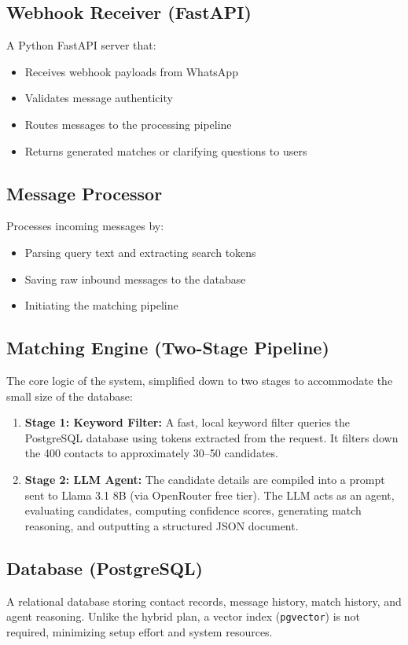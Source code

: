 \documentclass[12pt, a4paper]{report}
\newcommand{\techstack}[1]{\texttt{#1}}
\begin{document}
\subsection{Webhook Receiver (FastAPI)}
A Python FastAPI server that:
\begin{itemize}
    \item Receives webhook payloads from WhatsApp
    \item Validates message authenticity
    \item Routes messages to the processing pipeline
    \item Returns generated matches or clarifying questions to users
\end{itemize}

\subsection{Message Processor}
Processes incoming messages by:
\begin{itemize}
    \item Parsing query text and extracting search tokens
    \item Saving raw inbound messages to the database
    \item Initiating the matching pipeline
\end{itemize}

\subsection{Matching Engine (Two-Stage Pipeline)}
The core logic of the system, simplified down to two stages to accommodate the small size of the database:
\begin{enumerate}
    \item \textbf{Stage 1: Keyword Filter:} A fast, local keyword filter queries the PostgreSQL database using tokens extracted from the request. It filters down the 400 contacts to approximately 30--50 candidates.
    \item \textbf{Stage 2: LLM Agent:} The candidate details are compiled into a prompt sent to Llama 3.1 8B (via OpenRouter free tier). The LLM acts as an agent, evaluating candidates, computing confidence scores, generating match reasoning, and outputting a structured JSON document.
\end{enumerate}

\subsection{Database (PostgreSQL)}
A relational database storing contact records, message history, match history, and agent reasoning. Unlike the hybrid plan, a vector index (\techstack{pgvector}) is not required, minimizing setup effort and system resources.
\end{document}
